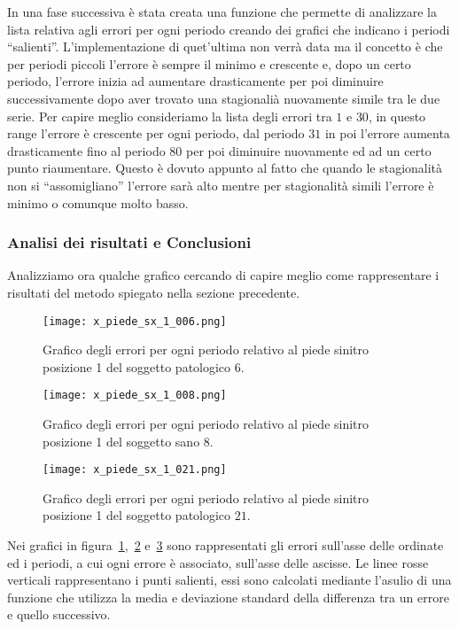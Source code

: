 In una fase successiva è stata creata una funzione che permette di analizzare la lista relativa
agli errori per ogni periodo creando dei grafici che indicano i periodi ``salienti''. 
L'implementazione di quet'ultima non verrà data ma il concetto è che per periodi piccoli l'errore
è sempre il minimo e crescente e, dopo un certo periodo, l'errore inizia ad aumentare drasticamente
per poi diminuire successivamente dopo aver trovato una stagionalià nuovamente simile tra le due serie.
Per capire meglio consideriamo la lista degli errori tra $1$ e $30$, in questo range l'errore è crescente
per ogni periodo, dal periodo $31$ in poi l'errore aumenta drasticamente fino al periodo $80$ per poi diminuire
nuovamente ed ad un certo punto riaumentare. Questo è dovuto appunto al fatto che quando le stagionalità non si
``assomigliano'' l'errore sarà alto mentre per stagionalità simili l'errore è minimo o comunque molto basso.


\subsubsection{Analisi dei risultati e Conclusioni}
Analizziamo ora qualche grafico cercando di capire meglio come rappresentare i risultati del metodo
spiegato nella sezione precedente.
\begin{figure}[H]
    \centering
    \texttt{[image: x\_piede\_sx\_1\_006.png]}
    \caption{Grafico degli errori per ogni periodo relativo al piede sinitro posizione 1 del soggetto patologico $6$.}
    \label{fig:x_piede_sx_1_006_m2}
\end{figure}
\begin{figure}[H]
    \centering
    \texttt{[image: x\_piede\_sx\_1\_008.png]}
    \caption{Grafico degli errori per ogni periodo relativo al piede sinitro posizione 1 del soggetto sano $8$.}
    \label{fig:x_piede_sx_1_008_m2}
\end{figure}
\begin{figure}[H]
    \centering
    \texttt{[image: x\_piede\_sx\_1\_021.png]}
    \caption{Grafico degli errori per ogni periodo relativo al piede sinitro posizione 1 del soggetto patologico $21$.}
    \label{fig:x_piede_sx_1_021_m2}
\end{figure}

Nei grafici in figura~\ref*{fig:x_piede_sx_1_006_m2},~\ref*{fig:x_piede_sx_1_008_m2} e~\ref*{fig:x_piede_sx_1_021_m2}
sono rappresentati gli errori sull'asse delle ordinate ed i periodi, a cui ogni errore è associato,
sull'asse delle ascisse. Le linee rosse verticali rappresentano i punti salienti, essi sono calcolati mediante
l'asulio di una funzione che utilizza la media e deviazione standard della differenza tra un errore 
e quello successivo.

